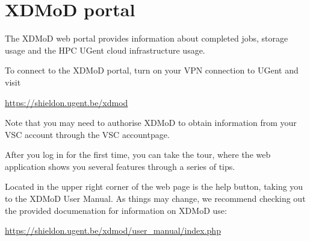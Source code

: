 \chapter{XDMoD portal}
\label{ch:xdmod}

The XDMoD web portal provides information about completed jobs, storage usage and
the HPC UGent cloud infrastructure usage.

To connect to the XDMoD portal, turn on your VPN connection to UGent and visit

\begin{center}\url{https://shieldon.ugent.be/xdmod}\end{center}

Note that you may need to authorise XDMoD to obtain information from your VSC
account through the VSC accountpage.

After you log in for the first time, you can take the tour, where the web
application shows you several features through a series of tips.

Located in the upper right corner of the web page is the help button, taking
you to the XDMoD User Manual. As things may change, we recommend checking out
the provided documenation for information on XDMoD use:

\begin{center}\url{https://shieldon.ugent.be/xdmod/user_manual/index.php}\end{center}

